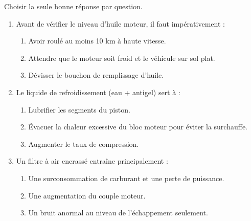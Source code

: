 \documentclass[11pt]{article}
\begin{document}
\begin{exercice}
Choisir la seule bonne réponse par question.
\begin{enumerate}
    \item Avant de vérifier le niveau d'huile moteur, il faut impérativement :
    \begin{enumerate}
        \item Avoir roulé au moins 10 km à haute vitesse.
        \item Attendre que le moteur soit froid et le véhicule sur sol plat.
        \item Dévisser le bouchon de remplissage d'huile.
    \end{enumerate}
    \item Le liquide de refroidissement (eau + antigel) sert à :
    \begin{enumerate}
        \item Lubrifier les segments du piston.
        \item Évacuer la chaleur excessive du bloc moteur pour éviter la surchauffe.
        \item Augmenter le taux de compression.
    \end{enumerate}
    \item Un filtre à air encrassé entraîne principalement :
    \begin{enumerate}
        \item Une surconsommation de carburant et une perte de puissance.
        \item Une augmentation du couple moteur.
        \item Un bruit anormal au niveau de l'échappement seulement.
    \end{enumerate}
\end{enumerate}
\end{exercice}
\end{document}
